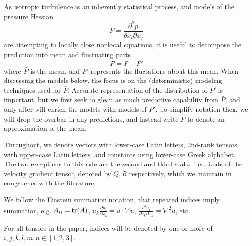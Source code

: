 As isotropic turbulence is an inherently statistical process, and models of the pressure Hessian 
\begin{equation}
    P = \frac{\partial^2 p}{\partial x_i \partial x_j}
\end{equation} are attempting to locally close nonlocal equations, it is useful to decompose the prediction into mean and fluctuating parts
\begin{equation}
    P = \bar{P} + P'
\end{equation}
where $\bar{P}$ is the mean, and $P'$ represents the fluctations about this mean. When discussing the models below, the focus is on the (deterministic) modeling techniques used for $\bar{P}$. Accurate representation of the distribution of $P'$ is important, but we first seek to glean as much predictive capability from $\bar{P}$, and only after will enrich the models with models of $P'$. To simplify notation then, we will drop the overbar in any predictions, and instead write $\hat{P}$ to denote an approximation of the mean.



Throughout, we denote vectors with lower-case Latin letters, 2nd-rank tensors with upper-case Latin letters, and constants using lower-case Greek alphabet. The two exceptions to this rule are the second and third scalar invariants of the velocity gradient tensor, denoted by $Q, R$ respectively, which we maintain in congruence with the literature. 

We follow the Einstein summation notation, that repeated indices imply summation, e.g. $A_{ii} = \text{tr}(A)$, $u_k \frac{\partial u_i}{\partial x_k} = u \cdot \nabla u$, $\frac{\partial^2 u_i}{\partial x_k \partial x_k} = \nabla^2 u$, etc.

For all tensors in the paper, indices will be denoted by one or more of $i,j,k,l,m,n \in [1,2,3]$.


